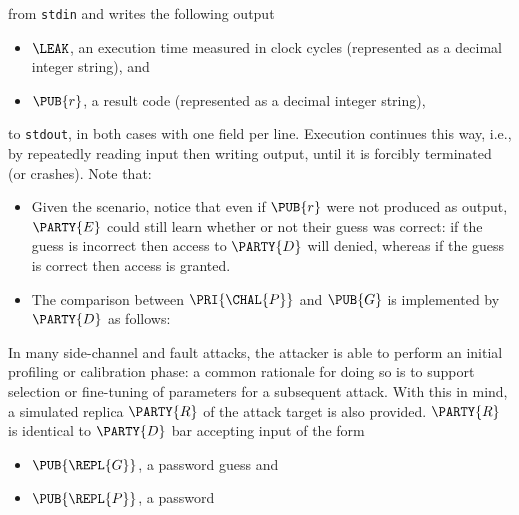 \documentclass[crop={false},multi={true},tikz={true}]{standalone}
\begin{document}
\noindent
from \lstinline[language={bash}]{stdin} and writes the following output

\begin{itemize}
\item $\LEAK$,
      an execution time measured in clock cycles
          (represented as a                       decimal integer string),
      and
\item $\PUB{r}$,
      a  result code
          (represented as a                       decimal integer string),
\end{itemize}

\noindent
to \lstinline[language={bash}]{stdout}, in both cases with one field per 
line.  Execution continues this way, i.e., by repeatedly reading input 
then writing output, until it is forcibly terminated (or crashes).  
Note that:

\begin{itemize}
\item Given the scenario, notice that even if $\PUB{r}$ were not produced 
      as output, $\PARTY{E}$ could still learn whether or not their guess 
      was correct: if the guess is incorrect then access to $\PARTY{D}$ 
      will denied, whereas if the guess is correct then access is granted.
\item The comparison between $\PRI{\CHAL{P}}$ and $\PUB{G}$ is implemented 
      by $\PARTY{D}$ as follows:

      \begin{algorithm}[H]
       {
        \;
      }
       {
         {
          \; 
        }
      }
      \; 
      \end{algorithm}
\end{itemize}


In many side-channel and fault attacks, the attacker is able to perform an 
initial profiling or calibration phase: a common rationale for doing so is 
to support selection or fine-tuning of parameters for a subsequent attack.  
With this in mind, a simulated replica $\PARTY{R}$ of the attack target is 
also provided.
$\PARTY{R}$ is identical to $\PARTY{D}$ bar accepting input of the form

\begin{itemize}
\item $\PUB{\REPL{G}}$,
      a  password guess
      and
\item $\PUB{\REPL{P}}$,
      a  password
\end{itemize}
\end{document}

